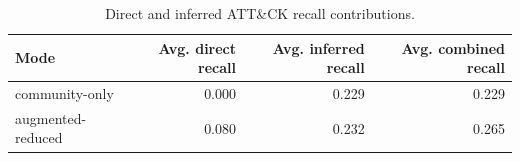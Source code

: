 \begin{table}[tb]
\centering
\caption{Direct and inferred ATT\&CK recall contributions.}
\label{tab:direct\_vs\_inferred}
\begin{tabular}{lrrr}
\toprule
Mode & Avg. direct recall & Avg. inferred recall & Avg. combined recall \\
\midrule
community-only & 0.000 & 0.229 & 0.229 \\
augmented-reduced & 0.080 & 0.232 & 0.265 \\
\bottomrule
\end{tabular}
\end{table}
